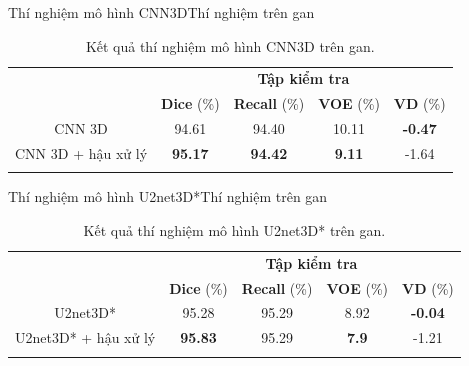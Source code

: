 \documentclass[
	10pt,                %
	aspectratio=169,     %
]{beamer}
\begin{document}
    \begin{frame}[noframenumbering]{Thí nghiệm mô hình CNN3D}{Thí nghiệm trên gan}
        \begin{table}[H]
            \renewcommand{\arraystretch}{1.2}
            \centering
            \begin{tabular}{c|c|c|c|c}
                \Xhline{3\arrayrulewidth}
                \multirow{2}{*}{\textbf{Thí nghiệm}} & \multicolumn{4}{c}{\textbf{Tập kiểm tra}}\\
                \cline{2-5} 
                & \textbf{Dice} (\%) & \textbf{Recall} (\%) & \textbf{VOE} (\%) & \textbf{VD} (\%) \\ 
                \hline
                CNN 3D          & 94.61              & 94.40                & 10.11    & \textbf{-0.47}\\ 
                \hline
                CNN 3D + hậu xử lý  & \textbf{95.17}   & \textbf{94.42} & \textbf{9.11}   & -1.64       \\ 
                \Xhline{3\arrayrulewidth}
            \end{tabular}
            \caption*{Kết quả thí nghiệm mô hình CNN3D trên gan.}
        \end{table}
    \end{frame}
    
    \begin{frame}[noframenumbering]{Thí nghiệm mô hình U2net3D*}{Thí nghiệm trên gan}
        \begin{table}[H]
            \renewcommand{\arraystretch}{1.1}
            \centering
            \begin{tabular}{c|c|c|c|c}
            \Xhline{3\arrayrulewidth}
            \multirow{2}{*}{\textbf{Thí nghiệm}} & \multicolumn{4}{c}{\textbf{Tập kiểm tra}}                             \\ \cline{2-5} 
            & \textbf{Dice} (\%) & \textbf{Recall} (\%) & \textbf{VOE} (\%) & \textbf{VD} (\%) \\ \hline
            U2net3D*      & 95.28     & 95.29     & 8.92     & \textbf{-0.04}    \\ \hline
            U2net3D* + hậu xử lý & \textbf{95.83}       & 95.29     & \textbf{7.9}   & -1.21       \\ 
            \Xhline{3\arrayrulewidth}
            \end{tabular}
            \caption*{Kết quả thí nghiệm mô hình U2net3D* trên gan.}
        \end{table}
    \end{frame}
	
\end{document}
